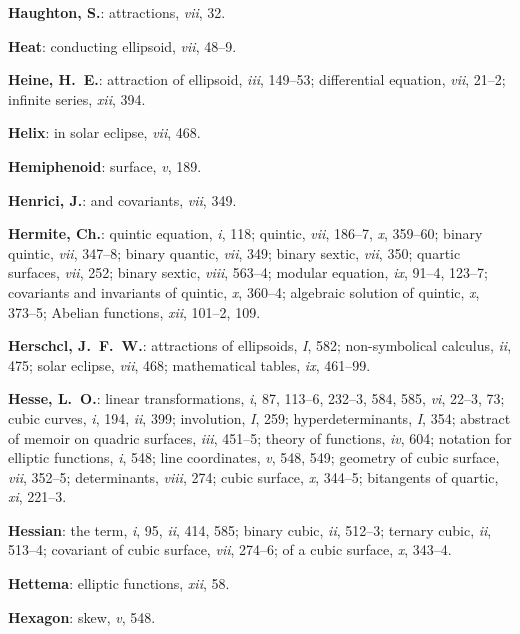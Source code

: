 \documentclass[11pt,a4paper]{article}
\newcommand{\IndexEntry}[1]{\textbf{#1}}
\newcommand{\V}[1]{\textit{#1}} %
\begin{document}
\IndexEntry{Haughton, S.}: attractions, \V{vii}, 32.

\IndexEntry{Heat}: conducting ellipsoid, \V{vii}, 48--9.

\IndexEntry{Heine, H.\ E.}: attraction of ellipsoid, \V{iii}, 149--53; differential equation, \V{vii}, 21--2; infinite series, \V{xii}, 394.

\IndexEntry{Helix}: in solar eclipse, \V{vii}, 468.

\IndexEntry{Hemiphenoid}: surface, \V{v}, 189.

\IndexEntry{Henrici, J.}: and covariants, \V{vii}, 349.

\IndexEntry{Hermite, Ch.}: quintic equation, \V{i}, 118; quintic, \V{vii}, 186--7, \V{x}, 359--60; binary quintic, \V{vii}, 347--8; binary quantic, \V{vii}, 349; binary sextic, \V{vii}, 350; quartic surfaces, \V{vii}, 252; binary sextic, \V{viii}, 563--4; modular equation, \V{ix}, 91--4, 123--7; covariants and invariants of quintic, \V{x}, 360--4; algebraic solution of quintic, \V{x}, 373--5; Abelian functions, \V{xii}, 101--2, 109.

\IndexEntry{Herschcl, J.\ F.\ W.}: attractions of ellipsoids, \V{I}, 582; non-symbolical calculus, \V{ii}, 475; solar eclipse, \V{vii}, 468; mathematical tables, \V{ix}, 461--99.

\newpage

\setcounter{page}{103}

\IndexEntry{Hesse, L.\ O.}: linear transformations, \V{i}, 87, 113--6, 232--3, 584, 585, \V{vi}, 22--3, 73; cubic curves, \V{i}, 194, \V{ii}, 399; involution, \V{I}, 259; hyperdeterminants, \V{I}, 354; abstract of memoir on quadric surfaces, \V{iii}, 451--5; theory of functions, \V{iv}, 604; notation for elliptic functions, \V{i}, 548; line coordinates, \V{v}, 548, 549; geometry of cubic surface, \V{vii}, 352--5; determinants, \V{viii}, 274; cubic surface, \V{x}, 344--5; bitangents of quartic, \V{xi}, 221--3.

\IndexEntry{Hessian}: the term, \V{i}, 95, \V{ii}, 414, 585; binary cubic, \V{ii}, 512--3; ternary cubic, \V{ii}, 513--4; covariant of cubic surface, \V{vii}, 274--6; of a cubic surface, \V{x}, 343--4.

\IndexEntry{Hettema}: elliptic functions, \V{xii}, 58.

\IndexEntry{Hexagon}: skew, \V{v}, 548.
\end{document}
